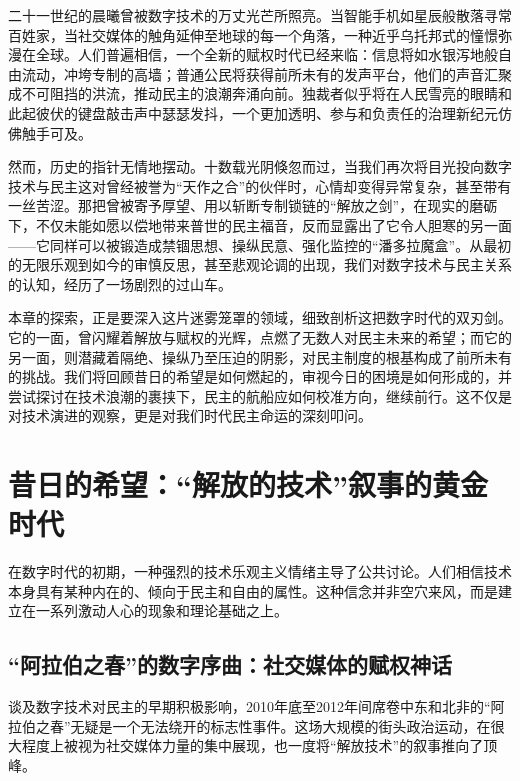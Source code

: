 \documentclass[UTF8, 10pt]{ctexbook}
\begin{document}
\lettrine[lines=3]{二}{十一世纪}的晨曦曾被数字技术的万丈光芒所照亮。当智能手机如星辰般散落寻常百姓家，当社交媒体的触角延伸至地球的每一个角落，一种近乎乌托邦式的憧憬弥漫在全球。人们普遍相信，一个全新的赋权时代已经来临：信息将如水银泻地般自由流动，冲垮专制的高墙；普通公民将获得前所未有的发声平台，他们的声音汇聚成不可阻挡的洪流，推动民主的浪潮奔涌向前。独裁者似乎将在人民雪亮的眼睛和此起彼伏的键盘敲击声中瑟瑟发抖，一个更加透明、参与和负责任的治理新纪元仿佛触手可及。

然而，历史的指针无情地摆动。十数载光阴倏忽而过，当我们再次将目光投向数字技术与民主这对曾经被誉为“天作之合”的伙伴时，心情却变得异常复杂，甚至带有一丝苦涩。那把曾被寄予厚望、用以斩断专制锁链的“解放之剑”，在现实的磨砺下，不仅未能如愿以偿地带来普世的民主福音，反而显露出了它令人胆寒的另一面——它同样可以被锻造成禁锢思想、操纵民意、强化监控的“潘多拉魔盒”。从最初的无限乐观到如今的审慎反思，甚至悲观论调的出现，我们对数字技术与民主关系的认知，经历了一场剧烈的过山车。

本章的探索，正是要深入这片迷雾笼罩的领域，细致剖析这把数字时代的双刃剑。它的一面，曾闪耀着解放与赋权的光辉，点燃了无数人对民主未来的希望；而它的另一面，则潜藏着隔绝、操纵乃至压迫的阴影，对民主制度的根基构成了前所未有的挑战。我们将回顾昔日的希望是如何燃起的，审视今日的困境是如何形成的，并尝试探讨在技术浪潮的裹挟下，民主的航船应如何校准方向，继续前行。这不仅是对技术演进的观察，更是对我们时代民主命运的深刻叩问。

\section{昔日的希望：“解放的技术”叙事的黄金时代}
\lettrine[lines=2]{在}{数字时代}的初期，一种强烈的技术乐观主义情绪主导了公共讨论。人们相信技术本身具有某种内在的、倾向于民主和自由的属性。这种信念并非空穴来风，而是建立在一系列激动人心的现象和理论基础之上。

\subsection{“阿拉伯之春”的数字序曲：社交媒体的赋权神话}
谈及数字技术对民主的早期积极影响，2010年底至2012年间席卷中东和北非的“阿拉伯之春”无疑是一个无法绕开的标志性事件。这场大规模的街头政治运动，在很大程度上被视为社交媒体力量的集中展现，也一度将“解放技术”的叙事推向了顶峰。
\end{document}
